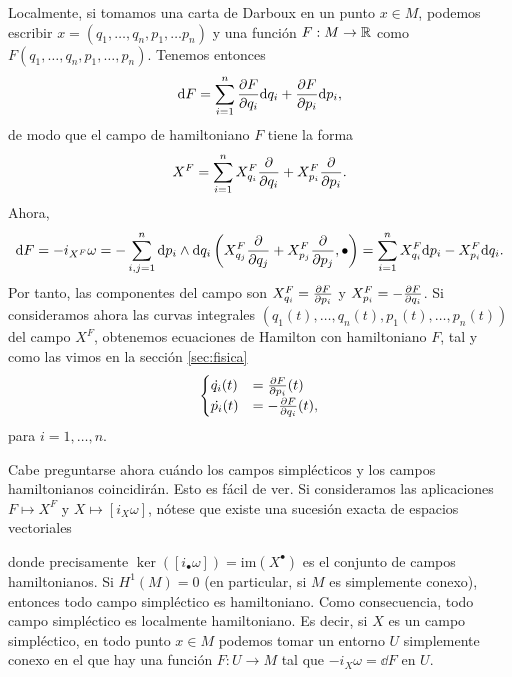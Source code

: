 Localmente, si tomamos una carta de Darboux en un punto $x\in M$, podemos escribir $x=(q_1,\dots,q_n,p_1,\dots p_n)$ y una función $F:M\rightarrow \mathbb{R}$ como $F(q_1,\dots,q_n,p_1,\dots,p_n)$. Tenemos entonces
\begin{equation*}
  \mathrm{d} F=\sum_{i=1}^n \frac{\partial F}{\partial q_i}\mathrm{d} q_i + \frac{\partial F}{\partial p_i} \mathrm{d} p_i,
\end{equation*}
de modo que el campo de hamiltoniano $F$ tiene la forma
\begin{equation*}
    X^F = \sum_{i=1}^n X_{q_i}^F \frac{\partial}{\partial q_i} + X_{p_i}^F \frac{\partial}{\partial p_i}.
\end{equation*}
  Ahora, 
  \begin{equation*}
    \mathrm{d} F =- i_{X^F}\omega=- \sum_{i,j=1}^n \mathrm{d} p_i \wedge \mathrm{d} q_i \left(X_{q_j}^F \frac{\partial}{\partial q_j} + X^F_{p_j} \frac{\partial}{\partial p_j},\bullet\right)  = \sum_{i=1}^n X_{q_i}^F \mathrm{d} p_i -X_{p_i}^F \mathrm{d} q_i.
  \end{equation*}
  Por tanto, las componentes del campo son $X^F_{q_i}=\frac{\partial F}{\partial p_i}$ y $X^F_{p_i}=-\frac{\partial F}{\partial q_i}$. Si consideramos ahora las curvas integrales $(q_1(t),\dots,q_n(t),p_1(t),\dots,p_n(t))$ del campo $X^F$, obtenemos ecuaciones de Hamilton con hamiltoniano $F$, tal y como las vimos en la sección \ref{sec:fisica}
  \begin{equation*}
  \begin{cases}
     \dot{q_i}(t) & = \frac{\partial F}{\partial p_i}(t) \\
     \dot{p_i}(t) & = -\frac{\partial F}{\partial q_i} (t),
  \end{cases}
\end{equation*}
  para $i=1,\dots,n$.

  Cabe preguntarse ahora cuándo los campos simplécticos y los campos hamiltonianos coincidirán. Esto es fácil de ver. Si consideramos las aplicaciones $F\mapsto X^F$ y $X\mapsto [i_X\omega]$, nótese que existe una sucesión exacta de espacios vectoriales
  \begin{center}
  \end{center}
  donde precisamente $\ker([i_{\bullet}\omega])=\mathrm{im}(X^{\bullet})$ es el conjunto de campos hamiltonianos.
  Si $H^1(M)=0$ (en particular, si $M$ es simplemente conexo), entonces todo campo simpléctico es hamiltoniano. Como consecuencia, todo campo simpléctico es localmente hamiltoniano. Es decir, si $X$ es un campo simpléctico, en todo punto $x\in M$ podemos tomar un entorno $U$ simplemente conexo en el que hay una función $F:U\rightarrow M$ tal que $-i_X\omega=\dd F$ en $U$.

